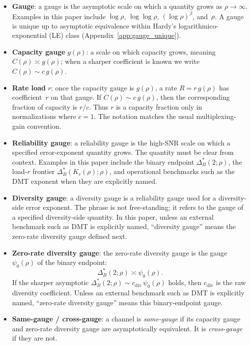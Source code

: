 \documentclass[lettersize,onecolumn]{IEEEtran}
\newcommand{\snr}{\rho}
\begin{document}
\begin{itemize}
\item \textbf{Gauge}: a gauge is the asymptotic scale on which a
quantity grows as $\snr\to\infty$. Examples in this paper include
$\log\snr$, $\log\log\snr$, $(\log\snr)^\beta$, and~$\snr$.
A gauge is unique up to asymptotic equivalence within Hardy's
logarithmico-exponential (LE) class
(Appendix~\ref{app:gauge_unique}).

\item \textbf{Capacity gauge} $g(\snr)$: a scale on which capacity
grows, meaning $C(\snr) \asymp g(\snr)$; when a sharper coefficient
is known we write $C(\snr) \sim c\,g(\snr)$.

\item \textbf{Rate load} $r$: once the capacity gauge is $g(\snr)$,
a rate $R = r\,g(\snr)$ has coefficient~$r$ on that gauge. If
$C(\snr) \sim c\,g(\snr)$, then the corresponding fraction of
capacity is $r/c$. Thus $r$ is a capacity fraction only in
normalizations where $c = 1$. The notation matches the usual
multiplexing-gain convention.

\item \textbf{Reliability gauge}: a reliability gauge is the
high-SNR scale on which a specified error-exponent quantity grows.
The quantity must be clear from context. Examples in this paper
include the binary endpoint $\Delta_B^*(2;\snr)$, the load-$r$
frontier $\Delta_B^*(K_r(\snr);\snr)$, and operational benchmarks
such as the DMT exponent when they are explicitly named.

\item \textbf{Diversity gauge}: a diversity gauge is a reliability
gauge used for a diversity-side error exponent. The phrase is not
free-standing; it refers to the gauge of a specified diversity-side
quantity. In this paper, unless an external benchmark such as DMT is
explicitly named, ``diversity gauge'' means the zero-rate diversity
gauge defined next.

\item \textbf{Zero-rate diversity gauge}: the zero-rate diversity
gauge is the gauge $\psi_0(\snr)$ of the binary endpoint:
\[
  \Delta_B^*(2;\snr) \asymp \psi_0(\snr).
\]
If the sharper asymptotic
$\Delta_B^*(2;\snr) \sim c_{\mathrm{div}}\,\psi_0(\snr)$ holds,
then $c_{\mathrm{div}}$ is the raw diversity coefficient.
Unless an external benchmark such as DMT is explicitly named,
``zero-rate diversity gauge'' means this binary-endpoint gauge.

\item \textbf{Same-gauge / cross-gauge}: a channel is
\emph{same-gauge} if its capacity gauge and zero-rate diversity
gauge are asymptotically equivalent. It is \emph{cross-gauge} if
they are not.


\end{itemize}
\end{document}
